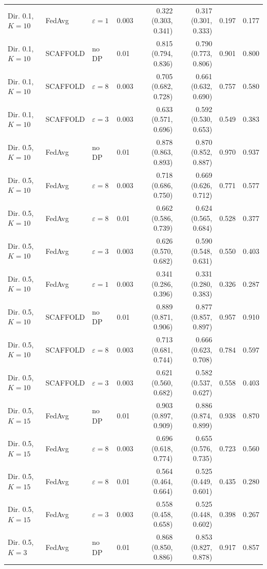 {\begin{longtable}{llllrrrr}
Dir. 0.1, $K{=}10$ & FedAvg & $\varepsilon=1$ & 0.003 & 0.322 (0.303, 0.341) & 0.317 (0.301, 0.333) & 0.197 & 0.177 \\
Dir. 0.1, $K{=}10$ & SCAFFOLD & no DP & 0.01 & 0.815 (0.794, 0.836) & 0.790 (0.773, 0.806) & 0.901 & 0.800 \\
Dir. 0.1, $K{=}10$ & SCAFFOLD & $\varepsilon=8$ & 0.003 & 0.705 (0.682, 0.728) & 0.661 (0.632, 0.690) & 0.757 & 0.580 \\
Dir. 0.1, $K{=}10$ & SCAFFOLD & $\varepsilon=3$ & 0.003 & 0.633 (0.571, 0.696) & 0.592 (0.530, 0.653) & 0.549 & 0.383 \\
Dir. 0.5, $K{=}10$ & FedAvg & no DP & 0.01 & 0.878 (0.863, 0.893) & 0.870 (0.852, 0.887) & 0.970 & 0.937 \\
Dir. 0.5, $K{=}10$ & FedAvg & $\varepsilon=8$ & 0.003 & 0.718 (0.686, 0.750) & 0.669 (0.626, 0.712) & 0.771 & 0.577 \\
Dir. 0.5, $K{=}10$ & FedAvg & $\varepsilon=8$ & 0.01 & 0.662 (0.586, 0.739) & 0.624 (0.565, 0.684) & 0.528 & 0.377 \\
Dir. 0.5, $K{=}10$ & FedAvg & $\varepsilon=3$ & 0.003 & 0.626 (0.570, 0.682) & 0.590 (0.548, 0.631) & 0.550 & 0.403 \\
Dir. 0.5, $K{=}10$ & FedAvg & $\varepsilon=1$ & 0.003 & 0.341 (0.286, 0.396) & 0.331 (0.280, 0.383) & 0.326 & 0.287 \\
Dir. 0.5, $K{=}10$ & SCAFFOLD & no DP & 0.01 & 0.889 (0.871, 0.906) & 0.877 (0.857, 0.897) & 0.957 & 0.910 \\
Dir. 0.5, $K{=}10$ & SCAFFOLD & $\varepsilon=8$ & 0.003 & 0.713 (0.681, 0.744) & 0.666 (0.623, 0.708) & 0.784 & 0.597 \\
Dir. 0.5, $K{=}10$ & SCAFFOLD & $\varepsilon=3$ & 0.003 & 0.621 (0.560, 0.682) & 0.582 (0.537, 0.627) & 0.558 & 0.403 \\
Dir. 0.5, $K{=}15$ & FedAvg & no DP & 0.01 & 0.903 (0.897, 0.909) & 0.886 (0.874, 0.899) & 0.938 & 0.870 \\
Dir. 0.5, $K{=}15$ & FedAvg & $\varepsilon=8$ & 0.003 & 0.696 (0.618, 0.774) & 0.655 (0.576, 0.735) & 0.723 & 0.560 \\
Dir. 0.5, $K{=}15$ & FedAvg & $\varepsilon=8$ & 0.01 & 0.564 (0.464, 0.664) & 0.525 (0.449, 0.601) & 0.435 & 0.280 \\
Dir. 0.5, $K{=}15$ & FedAvg & $\varepsilon=3$ & 0.003 & 0.558 (0.458, 0.658) & 0.525 (0.448, 0.602) & 0.398 & 0.267 \\
Dir. 0.5, $K{=}3$ & FedAvg & no DP & 0.01 & 0.868 (0.850, 0.886) & 0.853 (0.827, 0.878) & 0.917 & 0.857 \\

\end{longtable}}
